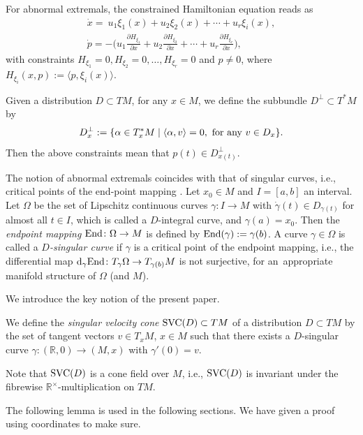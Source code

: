 \documentclass[pdftex]{sigma}
\numberwithin{equation}{section}
\theoremstyle{definition}
\newcommand{\R}{\mathbb{R}}
\newcommand{\0}{\boldsymbol{0}}
\newcommand{\pa}{\partial}
\newcommand{\SVC}{{\mbox {\rm SVC}}}
\begin{document}
For abnormal extremals, the constrained Hamiltonian equation reads as
\begin{gather*}
\dot{x} = \ u_1\xi_1(x) + u_2\xi_2(x) + \cdots + u_r\xi_i(x),
\\
\dot{p} = - \biggl(u_1\frac{\pa H_{\xi_1}}{\pa x} + u_2\frac{\pa H_{\xi_2}}{\pa x} + \cdots +
u_r\frac{\pa H_{\xi_r}}{\pa x}\biggr),
\end{gather*}
with constraints
$H_{\xi_1} = 0, H_{\xi_2} = 0, \dots, H_{\xi_r} = 0$ and $p \not= 0$,
where $H_{\xi_i}(x, p) := \langle p, \xi_i(x)\rangle$.

Given a distribution $D \subset TM$, for any $x \in M$, we define the subbundle $D^\perp \subset T^*M$ by
\[
D^\perp_x := \{ \alpha \in T^*_xM \mid \langle \alpha, v\rangle = 0, {\mbox{\rm\ for any\ }} v \in D_x\}.
\]
Then the above constraints mean that $p(t) \in D^\perp_{x(t)}$.

The notion of abnormal extremals coincides with that of singular curves, i.e.,
critical points of the end-point mapping \cite{Montgomery0, Montgomery}.
Let $x_0 \in M$ and $I = [a, b]$ an interval. Let
$\Omega$ be the set of Lipschitz continuous curves $\gamma\colon I \to M$ with
$\dot{\gamma}(t) \in D_{\gamma(t)}$ for almost all $t \in I$, which is called a $D$-integral curve,
and $\gamma(a) = x_0$.
Then the {\it endpoint mapping}
${\rm End}\colon \Omega \to M$
is defined by ${\rm End}(\gamma) := \gamma(b)$.
A curve $\gamma \in \Omega$ is called a {\it $D$-singular curve} if $\gamma$ is
a critical point of the endpoint mapping,
i.e., the differential map
${\rm d}_{\gamma}{\rm End}\colon T_{\gamma}\Omega \to T_{\gamma(b)}M$
is not surjective, for an~appropriate manifold structure of $\Omega$ (and $M$).

We introduce the key notion of the present paper.

\begin{Definition}
We define the {\it singular velocity cone} $\SVC(D) \subset TM$ of a distribution ${D \subset TM}$ by
the set of tangent vectors $v \in T_xM$, $x \in M$ such that there exists a $D$-singular curve
$\gamma\colon (\R, 0) \to (M, x)$ with $\gamma'(0) = v$.
\end{Definition}

Note that $\SVC(D)$ is a cone field over $M$, i.e., $\SVC(D)$ is invariant under
the fibrewise $\R^\times$-multiplication on $TM$.

The following lemma is used in the following sections. We have given a proof using coordinates to make sure.
\end{document}

